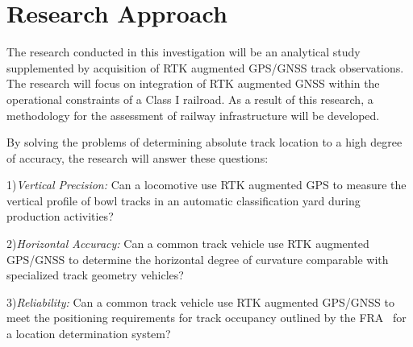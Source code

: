 \section{Research Approach}

The research conducted in this investigation will be an analytical study
supplemented by acquisition of RTK augmented GPS/GNSS track observations. The research will focus on integration of RTK augmented GNSS within the operational constraints of a Class I railroad. As a result of this research, a methodology for the assessment of railway infrastructure will be developed.

By solving the problems of determining absolute track location to a high degree of accuracy, the research will answer these questions:

1)\emph{Vertical Precision:}
Can a locomotive use RTK augmented GPS to measure the  vertical profile of bowl tracks in an automatic classification yard during production activities?

2)\emph{Horizontal Accuracy:}
Can a common track vehicle use RTK augmented GPS/GNSS to determine the horizontal degree of curvature comparable with specialized track geometry vehicles?

3)\emph{Reliability:}
Can a common track vehicle use RTK augmented GPS/GNSS to meet the positioning requirements for track occupancy outlined by the FRA~\citep[pp.6-7]{1995FRADiffe} for a location determination system?
